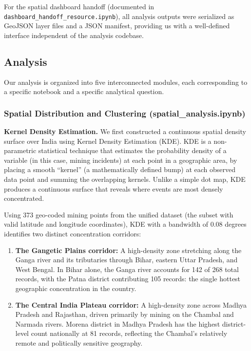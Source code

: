 \documentclass[12pt]{article}
\begin{document}
For the spatial dashboard handoff (documented in \texttt{dashboard\_handoff\_resource.ipynb}), all analysis outputs were serialized as GeoJSON layer files and a JSON manifest, providing us with a well-defined interface independent of the analysis codebase.

\subsection{Analysis}

Our analysis is organized into five interconnected modules, each corresponding to a specific notebook and a specific analytical question.

\subsubsection{Spatial Distribution and Clustering (spatial\_analysis.ipynb)}
\label{sec:spatial}

\textbf{Kernel Density Estimation.} We first constructed a continuous spatial density surface over India using Kernel Density Estimation (KDE). KDE is a non-parametric statistical technique that estimates the probability density of a variable (in this case, mining incidents) at each point in a geographic area, by placing a smooth ``kernel'' (a mathematically defined bump) at each observed data point and summing the overlapping kernels. Unlike a simple dot map, KDE produces a continuous surface that reveals where events are most densely concentrated.

Using 373 geo-coded mining points from the unified dataset (the subset with valid latitude and longitude coordinates), KDE with a bandwidth of 0.08 degrees identifies two distinct concentration corridors:

\begin{enumerate}
    \item \textbf{The Gangetic Plains corridor:} A high-density zone stretching along the Ganga river and its tributaries through Bihar, eastern Uttar Pradesh, and West Bengal. In Bihar alone, the Ganga river accounts for 142 of 268 total records, with the Patna district contributing 105 records: the single hottest geographic concentration in the country.
    \item \textbf{The Central India Plateau corridor:} A high-density zone across Madhya Pradesh and Rajasthan, driven primarily by mining on the Chambal and Narmada rivers. Morena district in Madhya Pradesh has the highest district-level count nationally at 81 records, reflecting the Chambal's relatively remote and politically sensitive geography.
\end{enumerate}
\end{document}
